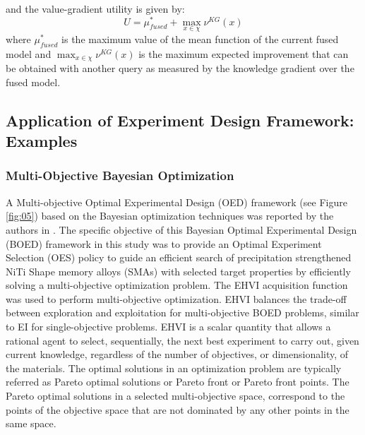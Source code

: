 \documentclass[utf8]{frontiersSCNS} %
\begin{document}
and the value-gradient utility is given by:
\begin{equation}
U = \mu^*_{fused} + \max_{x \in \chi} \nu^{KG}(x)
\end{equation}
where $\mu^*_{fused}$ is the maximum value of the mean function of the current fused model and $\max_{x \in \chi} \nu^{KG}(x)$ is the maximum expected improvement that can be obtained with another query as measured by the knowledge gradient over the fused model. 

\subsection{ Application of Experiment Design Framework: Examples}

\subsubsection{ Multi-Objective Bayesian Optimization}

A Multi-objective Optimal Experimental Design (OED) framework (see Figure \ref{fig:05}) based on the Bayesian optimization techniques was reported by the authors in \cite{solomou2018multi}. The specific objective of this Bayesian Optimal Experimental Design (BOED) framework in this study was to provide an Optimal Experiment Selection (OES) policy to guide an efficient search of precipitation strengthened NiTi Shape memory alloys (SMAs) with selected target properties by efficiently solving a multi-objective optimization problem. The EHVI \cite{emmerich2011hypervolume} acquisition function was used to perform multi-objective optimization. EHVI balances the trade-off between exploration and exploitation for multi-objective BOED problems, similar to EI for single-objective problems. EHVI is a scalar quantity that allows a rational agent to select, sequentially, the next best experiment to carry out, given current knowledge, regardless of the number of objectives, or dimensionality, of the materials. The optimal solutions in an optimization problem are typically referred as Pareto optimal solutions or Pareto front or Pareto front points. The Pareto optimal solutions in a selected multi-objective space, correspond to the points of the objective space that are not dominated by any other points in the same space.
\end{document}
